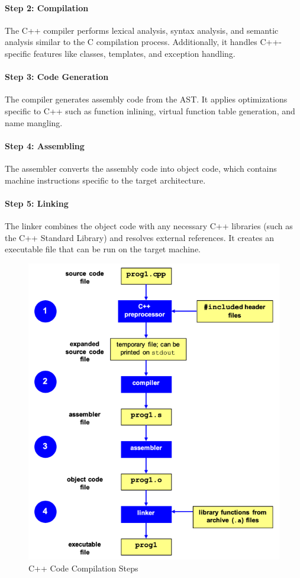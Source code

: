 \documentclass[12pt]{article}
\begin{document}
\paragraph*{Step 2: Compilation}
The C++ compiler performs lexical analysis, syntax analysis, and semantic analysis similar to the C compilation process. Additionally, it handles C++-specific features like classes, templates, and exception handling.

\paragraph*{Step 3: Code Generation}
The compiler generates assembly code from the AST. It applies optimizations specific to C++ such as function inlining, virtual function table generation, and name mangling.

\paragraph*{Step 4: Assembling}
The assembler converts the assembly code into object code, which contains machine instructions specific to the target architecture.

\paragraph*{Step 5: Linking}
The linker combines the object code with any necessary C++ libraries (such as the C++ Standard Library) and resolves external references. It creates an executable file that can be run on the target machine.

\begin{figure}[H]
    \centering
    \includegraphics[width=0.5\linewidth]{c++.png}
    \caption{C++ Code Compilation Steps}
\end{figure}
\end{document}
